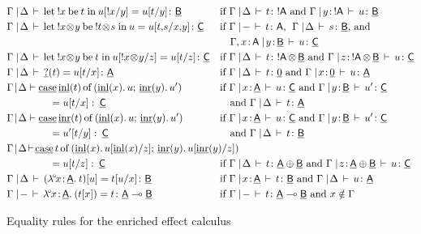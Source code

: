 \documentclass{LMCS}
\newcommand{\comptype}[1]{\underline{#1}}
\newcommand{\VA}{\mathsf{A}}
\newcommand{\CA}{\comptype{\mathsf{A}}}
\newcommand{\CB}{\comptype{\mathsf{B}}}
\newcommand{\CC}{\comptype{\mathsf{C}}}
\newcommand{\lpop}{\multimap}
\newcommand{\Cbang}[1]{{! #1}}
\newcommand{\Ccopower}[2]{! #1 \, {\otimes} \, #2}
\newcommand{\Czero}{\comptype{0}}
\newcommand{\Cplus}{\oplus}
\newcommand{\In}[2]{#1 \colon  \! #2}
\newcommand{\rIn}[2]{#1 \colon  #2}
\newcommand{\Cj}[4]{#1 \mid  \! #2 \, \vdash \, \rIn{#3}{#4}}
\newcommand{\Vj}[3]{\Cj{#1}{{-}}{#2}{#3}}
\newcommand{\Ceq}[5]{#1 \mid  \! #2 \, \vdash \, #3 = #4 \colon #5}
\newcommand{\Veq}[4]{\Ceq{#1}{-}{#2}{#3}{#4}}
\newcommand{\compop}[1]{\underline{#1}}
\newcommand{\bang}[1]{{! #1}}
\newcommand{\banglet}[3]{\mathrm{let}\: {\bang #1}\:\mathrm{be}\:{#2} \;\mathrm{in}\: #3}
\newcommand{\llambda}{\lambda^{\!\circ\!}}
\newcommand{\llam}[3]{\llambda \In{#1}{#2}.\: #3}
\newcommand{\lappl}[2]{#1[#2]}
\newcommand{\copowerterm}[2]{{\bang{#1}}\! \otimes \! #2}
\newcommand{\copowerlet}[4]{\mathrm{let}\: {\copowerterm{#1}{#2}}\:\mathrm{be}\:{#3} \;\mathrm{in}\: #4}
\newcommand{\Cimage}[1]{\compop{?}(#1)}
\newcommand{\Cinl}[1]{\compop{\mathrm{inl}}(#1)}
\newcommand{\Cinr}[1]{\compop{\mathrm{inr}}(#1)}
\newcommand{\Ccase}[5]{\compop{\mathrm{case}} \, #1 \,\mathrm{of}\,( \Cinl{#2}. \, #3 ; \, \Cinr{#4}. \, #5)}
\begin{document}
\begin{figure}
\begin{align*}
& \Ceq{\Gamma}{\Delta}{\banglet{x}{t}{u[\bang{x}/y]}}{u[t / y]}{\CB}
  && \text{if $\Cj{\Gamma}{\Delta}{t}{\Cbang{\VA}}$ and $\Cj{\Gamma}{\In{y}{\Cbang{\VA}}}{u}{\CB}$}
\\
& \Ceq{\Gamma}{\Delta}{\copowerlet{x}{y}{\copowerterm{t}{s}}{u}}{u[t,\! s / x, \! y]}{\CC} 
 && \text{if $\Vj{\Gamma}{t}{\VA}$, $\; \Cj{\Gamma}{\Delta}{s}{\CB}$, and}
\\
&
 && \quad\text{$\Cj{\Gamma, \In{x}{\VA}}{\In{y}{\CB}}{u}{\CC}$}
\\
& \Ceq{\Gamma}{\Delta}{\copowerlet{x}{y}{t}{u[\copowerterm{x}{y} / z]}}{u[t / z]}{\CC} 
&& \text{if $\Cj{\Gamma}{\Delta}{t}{\Ccopower{\VA}{\CB}}$ and $\Cj{\Gamma}{\In{z}{\Ccopower{\VA}{\CB}}}{u}{\CC}$}
\\
& \Ceq{\Gamma}{\Delta}{\Cimage{t}}{u[t/x]}{\CA}
 && \text{if $\Cj{\Gamma}{\Delta}{t}{\Czero}$ and $\Cj{\Gamma}{\In{x}{\Czero}}{u}{\CA}$}
\\
& {\Gamma} \! \mid \! {\Delta} \vdash {\Ccase{\Cinl{t}}{x}{u}{y}{u'}}
 && \text{if $\Cj{\Gamma}{\In{x}{\CA}}{u}{\CC}$ and $\Cj{\Gamma}{\In{y}{\CB}}{u'}{\CC}$}
\\
& \phantom{\Gamma\mid \Delta \vdash \quad} =  {u[t/x]} \, \colon \, {\CC}
 && \quad\text{and $\Cj{\Gamma}{\Delta}{t}{\CA}$}
\\
& {\Gamma} \! \mid \! {\Delta}  \vdash {\Ccase{\Cinr{t}}{x}{u}{y}{u'}} 
 && \text{if $\Cj{\Gamma}{\In{x}{\CA}}{u}{\CC}$ and $\Cj{\Gamma}{\In{y}{\CB}}{u'}{\CC}$}
\\
& \phantom{\Gamma\mid \Delta \vdash \quad} = {u'[t/y]} \, \colon \, {\CC}
&& \quad \text{and $\Cj{\Gamma}{\Delta}{t}{\CB}$}
\\
& \Gamma  \! \mid  \! \Delta \! \vdash \! \Ccase{t}{x}{u[\Cinl{x} / z]}{y}{ u[\Cinr{y} / z]} \hspace*{-50pt}\\
& \phantom{\Gamma\mid \Delta \vdash \quad} = u[t / z] \, \colon \, \CC
 && \text{if $\Cj{\Gamma}{\Delta}{t}{\CA \Cplus \CB}$ and $\Cj{\Gamma}{\In{z}{\CA \Cplus \CB}}{u}{\CC}$}
\\
& \Ceq{\Gamma}{\Delta}{\lappl{(\llam{x}{\CA}{t})}{u}}{t[u/x]}{\CB} 
  && \text{if $\Cj{\Gamma}{\In{x}{\CA}}{t}{\CB}$ and $\Cj{\Gamma}{\Delta}{u}{\CA}$}
\\
& \Veq{\Gamma}{\llam{x}{\CA}{(\lappl{t}{x})}}{t}{\CA \lpop \CB}
 && \text{if $\Vj{\Gamma}{t}{\CA \lpop \CB}$ and $x\notin \Gamma$}
\end{align*}
\caption{Equality rules for the enriched effect calculus}
\label{figure:effects:equalities}
\vspace*{30pt}
\end{figure}
\end{document}
